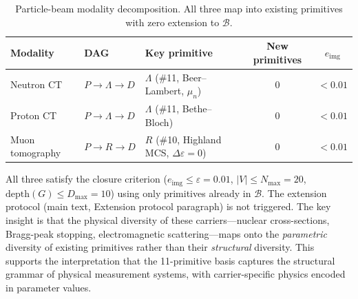 \documentclass[11pt]{article}
\begin{document}
\begin{table}[ht]
\centering\small
\caption{Particle-beam modality decomposition. All three map into existing
primitives with zero extension to $\mathcal{B}$.}
\label{tab:particle_beam}
\begin{tabular}{@{}lllcc@{}}
\toprule
Modality & DAG & Key primitive & New primitives & $e_{\mathrm{img}}$ \\
\midrule
Neutron CT      & $P \to \Lambda \to D$ & $\Lambda$ (\#11, Beer--Lambert, $\mu_n$) & 0 & $<0.01$ \\
Proton CT       & $P \to \Lambda \to D$ & $\Lambda$ (\#11, Bethe--Bloch)           & 0 & $<0.01$ \\
Muon tomography & $P \to R \to D$       & $R$ (\#10, Highland MCS, $\Delta\varepsilon{=}0$) & 0 & $<0.01$ \\
\bottomrule
\end{tabular}
\end{table}

\noindent All three satisfy the closure criterion ($e_{\mathrm{img}} \leq
\varepsilon = 0.01$, $|V| \leq N_{\max} = 20$, $\mathrm{depth}(G) \leq
D_{\max} = 10$) using only primitives already in $\mathcal{B}$.  The
extension protocol (main text, Extension protocol paragraph) is not triggered.
The key insight is that the physical diversity of these carriers---nuclear
cross-sections, Bragg-peak stopping, electromagnetic scattering---maps onto
the \emph{parametric} diversity of existing primitives rather than their
\emph{structural} diversity.  This supports the interpretation that the
11-primitive basis captures the structural grammar of physical measurement
systems, with carrier-specific physics encoded in parameter values.
\end{document}
